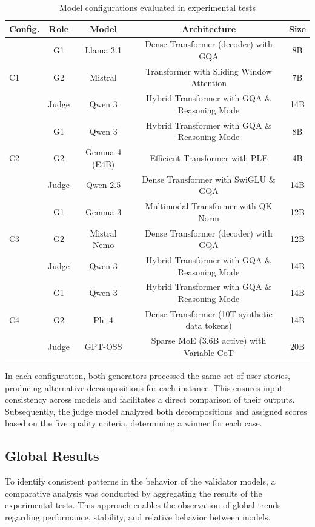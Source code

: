 \documentclass[pdflatex,sn-mathphys-num]{sn-jnl}%
\theoremstyle{thmstyleone}%
\theoremstyle{thmstyletwo}%
\theoremstyle{thmstylethree}%
\begin{document}
\begin{table}[ht]
\centering
\caption{Model configurations evaluated in experimental tests}
\label{tab:model_configs}
\begin{tabular}{lcccc}
\toprule
Config. & Role & Model & Architecture & Size \\
\midrule
\multirow{3}{*}{C1}  
& G1 & Llama 3.1 & Dense Transformer (decoder) with GQA & 8B \\
& G2 & Mistral & Transformer with Sliding Window Attention & 7B \\
& Judge & Qwen 3 & Hybrid Transformer with GQA \& Reasoning Mode & 14B \\
\midrule
\multirow{3}{*}{C2}  
& G1 & Qwen 3 & Hybrid Transformer with GQA \& Reasoning Mode & 8B \\
& G2 & Gemma 4 (E4B) & Efficient Transformer with PLE & 4B \\
& Judge & Qwen 2.5 & Dense Transformer with SwiGLU \& GQA & 14B \\
\midrule
\multirow{3}{*}{C3}  
& G1 & Gemma 3 & Multimodal Transformer with QK Norm & 12B \\
& G2 & Mistral Nemo & Dense Transformer (decoder) with GQA & 12B \\
& Judge & Qwen 3 & Hybrid Transformer with GQA \& Reasoning Mode & 14B \\
\midrule
\multirow{3}{*}{C4}  
& G1 & Qwen 3 & Hybrid Transformer with GQA \& Reasoning Mode & 14B \\
& G2 & Phi-4 & Dense Transformer (10T synthetic data tokens) & 14B \\
& Judge & GPT-OSS & Sparse MoE (3.6B active) with Variable CoT & 20B \\
\bottomrule
\end{tabular}
\end{table}

In each configuration, both generators processed the same set of user stories, producing alternative decompositions for each instance. This ensures input consistency across models and facilitates a direct comparison of their outputs. Subsequently, the judge model analyzed both decompositions and assigned scores based on the five quality criteria, determining a winner for each case.

\subsection{Global Results}

To identify consistent patterns in the behavior of the validator models, a comparative analysis was conducted by aggregating the results of the experimental tests. This approach enables the observation of global trends regarding performance, stability, and relative behavior between models.
\end{document}
